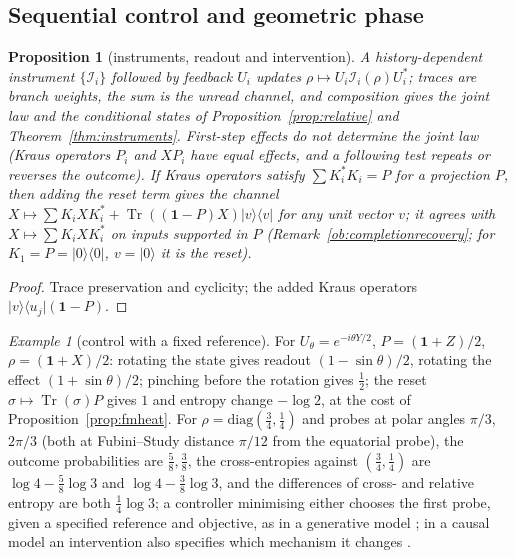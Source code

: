 \documentclass[aps,pra,onecolumn,superscriptaddress,nofootinbib,10pt]{revtex4-2}
\newtheorem{proposition}[theorem]{Proposition}
\theoremstyle{definition}
\theoremstyle{remark}
\newtheorem{example}[theorem]{Example}
\newcommand{\tr}{\operatorname{Tr}}
\begin{document}
\subsection{Sequential control and geometric phase}\label{sec:fmcontrol}

\begin{proposition}[instruments, readout and intervention]\label{prop:fminstrument}
A history-dependent instrument $\{\mathcal I_i\}$ followed by feedback $U_i$ updates $\rho\mapsto U_i\mathcal I_i(\rho)U_i^*$; traces are branch weights,
the sum is the unread channel, and composition gives the joint law and the conditional states of
Proposition~\ref{prop:relative} and Theorem~\ref{thm:instruments}.  First-step effects do not determine the joint
law (Kraus operators $P_i$ and $XP_i$ have equal effects, and a following test repeats or reverses the
outcome).  If Kraus operators satisfy $\sum K_i^*K_i=P$ for a projection $P$, then adding the reset term gives the channel
$X\mapsto\sum K_iXK_i^*+\tr((\mathbf1-P)X)\lvert v\rangle\langle v\rvert$ for any unit vector $v$; it agrees with $X\mapsto\sum K_iXK_i^*$ on inputs supported in $P$
(Remark~\ref{ob:completionrecovery}; for $K_1=P=\lvert0\rangle\langle0\rvert$, $v=\lvert0\rangle$ it is the reset).
\end{proposition}
\begin{proof}
Trace preservation and cyclicity; the added Kraus operators $\lvert v\rangle\langle u_j\rvert(\mathbf1-P)$.
\end{proof}

\begin{example}[control with a fixed reference]\label{ex:fmaction}
For $U_\theta=e^{-i\theta Y/2}$, $P=(\mathbf1+Z)/2$, $\rho=(\mathbf1+X)/2$: rotating the state gives readout $(1-\sin\theta)/2$, rotating the effect $(1+\sin\theta)/2$;
pinching before the rotation gives $\tfrac12$; the reset $\sigma\mapsto\tr(\sigma)P$ gives $1$ and entropy change $-\log2$, at the cost of
Proposition~\ref{prop:fmheat}.  For $\rho=\mathrm{diag}(\tfrac34,\tfrac14)$ and probes at polar angles $\pi/3$, $2\pi/3$ (both at Fubini--Study distance
$\pi/12$ from the equatorial probe), the outcome probabilities are $\tfrac58,\tfrac38$, the cross-entropies against $(\tfrac34,\tfrac14)$ are
$\log4-\tfrac58\log3$ and $\log4-\tfrac38\log3$, and the differences of cross- and relative entropy are both $\tfrac14\log3$; a controller
minimising either chooses the first probe, given a specified reference and objective, as in a
generative model \cite{n2-friston}; in a causal model an intervention also specifies which mechanism it
changes \cite{n2-pearl}.
\end{example}
\end{document}
